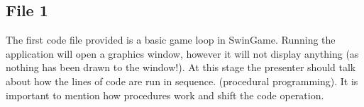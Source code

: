 \documentclass[12pt]{article}
\begin{document}
\subsection*{File 1}
The first code file provided is a basic game loop in SwinGame. Running the application will open a graphics window, however it will not display anything
(as nothing has been drawn to the window!).
At this stage the presenter should talk about how the lines of code are run in sequence. (procedural programming). It is important to mention how procedures work
and shift the code operation.

\newpage
\end{document}
